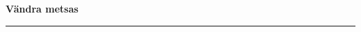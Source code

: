 \documentclass[10pt]{book}
\begin{document}
{
  \samepage
  \raggedbottom
  \raggedright
  \sloppy


  \vspace{0.2in}

  \noindent\begin{minipage}{.1\textwidth}
    \hfill\vspace{0.1in}
  \end{minipage}%
  \noindent\begin{minipage}{.8\textwidth}
    \centering
    \bfseries
    \large V\"andra metsas
  \end{minipage}%
  \noindent\begin{minipage}{.1\textwidth}
      \hfill\vspace{0.1in}
  \end{minipage}

  \nopagebreak[4]
  \vspace{0.1in}
  \nopagebreak[4]
  \hrule height 0.05ex
  \nopagebreak[4]
  \vspace{-0.05in}



  \vspace{0.01in}
  \nopagebreak[4]
  {%
\parindent 0pt
\noindent
\ifx\preLilyPondExample \undefined
\else
  \expandafter\preLilyPondExample
\fi
\def\lilypondbook{}%

\ifx\postLilyPondExample \undefined
\else
  \expandafter\postLilyPondExample
\fi
}

}
\end{document}
